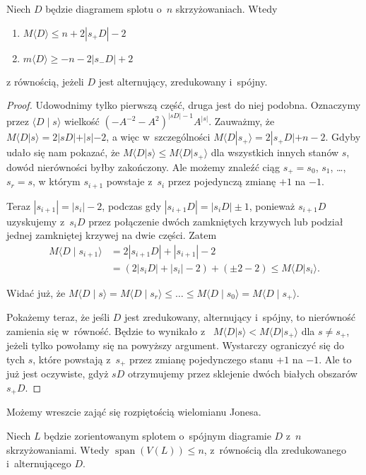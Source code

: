 \begin{lemma}
Niech $D$ będzie diagramem splotu o~$n$ skrzyżowaniach.
Wtedy
\begin{enumerate}
\item $M \langle D \rangle \le n+2|s_+D|-2$
\item $m \langle D \rangle \ge -n-2|s_-D|+2$
\end{enumerate}
z równością, jeżeli $D$ jest alternujący, zredukowany i~spójny.
\end{lemma}

\begin{proof}
Udowodnimy tylko pierwszą część, druga jest do niej podobna.
Oznaczymy przez $\langle D \mid s \rangle$ wielkość $(-A^{-2}-A^2)^{|sD|-1}A^{|s|}$.
Zauważmy, że $M\langle D|s\rangle=2|sD|+|s|-2$,
a więc w~szczególności $M\langle D|s_+\rangle=2|s_+D|+n-2$.
Gdyby udało się nam pokazać, że $M\langle D|s\rangle \le M\langle D|s_+\rangle$
dla wszystkich innych stanów $s$, dowód nierówności byłby zakończony.
Ale możemy znaleźć ciąg $s_+ = s_0$, $s_1$, \ldots, $s_r=s$,
w którym $s_{i+1}$ powstaje z~$s_i$ przez pojedynczą zmianę $+1$ na $-1$.

Teraz $|s_{i+1}|=|s_i|-2$, podczas gdy $|s_{i+1}D|=|s_iD|\pm 1$,
ponieważ $s_{i+1}D$ uzyskujemy z~$s_{i}D$ przez połączenie dwóch zamkniętych krzywych lub podział jednej zamkniętej krzywej na dwie części.
Zatem
\begin{align*}
    M \langle D \mid s_{i+1} \rangle & =
    2|s_{i+1}D|+|s_{i+1}|-2 \\ & =
    (2|s_iD| + |s_i| -2 ) + (\pm 2-2) \le
    M \langle D|s_i\rangle.
\end{align*}

Widać już, że $M\langle D \mid s\rangle =M\langle D \mid s_r\rangle \le\ldots\le M\langle D \mid s_0\rangle=M\langle D \mid s_+\rangle$.

Pokażemy teraz, że jeśli $D$ jest zredukowany, alternujący i~spójny, to nierówność zamienia się w~równość.
Będzie to wynikało z~ $M\langle D|s\rangle<M\langle D| s_+\rangle$
dla $s\neq s_+$, jeżeli tylko powołamy się na powyższy argument.
Wystarczy ograniczyć się do tych $s$, które powstają z~$s_+$ przez zmianę pojedynczego stanu $+1$ na $-1$.
Ale to już jest oczywiste, gdyż $sD$ otrzymujemy przez sklejenie dwóch białych obszarów $s_+ D$.
\end{proof}

Możemy wreszcie zająć się rozpiętością wielomianu Jonesa.

\begin{theorem}
Niech $L$ będzie zorientowanym splotem o~spójnym diagramie $D$ z~$n$ skrzyżowaniami.
Wtedy $\operatorname{span}(V(L)) \le n$, z~równością dla zredukowanego i~alternującego $D$.
\end{theorem}

